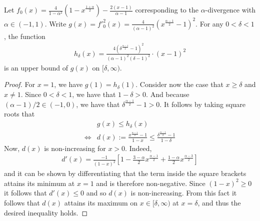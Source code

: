 \begin{lemma}\label{lemma:upper-bound-alpha}
Let $f_0(x) = \frac{4}{1-\alpha^2}\left(1 -x^{\frac{1+\alpha}{2}}\right) - \frac{2(x-1)}{\alpha-1}$ corresponding to the $\alpha$-divergence with $\alpha \in (-1,1)$. 
Write $g(x) = f'^2_0(x) = \frac{4}{(\alpha -1)^2} \left(x^\frac{\alpha-1}{2} - 1\right)^2$.
For any $0<\delta<1$, the function
\begin{align*}
    h_\delta(x) = \frac{4\left(\delta^\frac{\alpha-1}{2} - 1\right)^2}{(\alpha - 1)^2 (\delta- 1)^2}\cdot (x-1)^2
\end{align*}
is an upper bound of $g(x)$ on $[\delta, \infty)$.
\end{lemma}
\begin{proof}
For $x=1$, we have $g(1)=h_\delta(1)$. 
Consider now the case that $x\geq\delta$ and $x\not=1$. 
Since $0<\delta <1$, we have that $1-\delta > 0$.
And because $(\alpha-1)/2 \in (-1,0)$, we have that $\delta^{\frac{\alpha - 1}{2}} - 1 > 0$.
It follows by taking square roots that
\begin{align*}
    &g(x) \leq h_\delta(x) \\
    \iff& d(x) := \frac{x^{\frac{\alpha -1}{2}} -1}{1-x} \leq \frac{\delta^{\frac{\alpha -1}{2}} -1}{1-\delta} 
\end{align*}
Now, $d(x)$ is non-increasing for $x>0$. Indeed,
\begin{align*}
    d'(x) = \frac{-1}{(1-x)^2} \left[ 1 - \frac{3 - \alpha}{2}x^{\frac{\alpha -1}{2}} + \frac{1-\alpha}{2} x^{\frac{\alpha-3}{2}} \right]
\end{align*}
and it can be shown by differentiating that the term inside the square brackets attains its minimum at $x=1$ and is therefore non-negative. Since $(1-x)^2 \geq 0$ it follows that $d'(x) \leq 0$ and so $d(x)$ is non-increasing.
From this fact it follows that $d(x)$ attains its maximum on $x \in [\delta, \infty)$ at $x=\delta$, and thus the desired inequality holds. 
\end{proof}

\medskip

